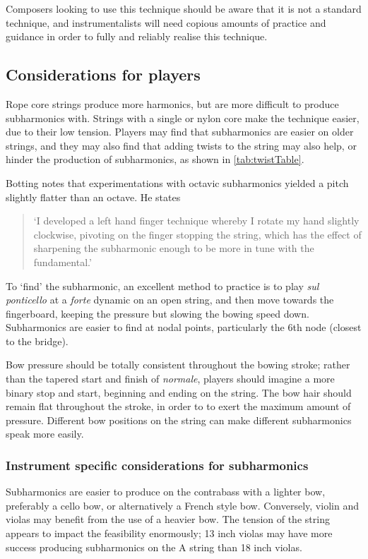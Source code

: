 Composers looking to use this technique should be aware that it is not a standard technique, and instrumentalists will need copious amounts of practice and guidance in order to fully and reliably realise this technique.

\subsection{Considerations for players}
Rope core strings produce more harmonics, but are more difficult to produce subharmonics with.
Strings with a single or nylon core make the technique easier, due to their low tension.\autocite[99]{welbanksFoundationsModernCello}
Players may find that subharmonics are easier on older strings, and they may also find that adding twists to the string may also help, or hinder the production of subharmonics, as shown in \autoref{tab:twistTable}.\autocite[]{kimuraHowProduceSubharmonics1999}


Botting notes that experimentations with octavic subharmonics yielded a pitch slightly flatter than an octave. He states \begin{quotation}
  `I developed a left hand finger technique whereby I rotate my hand slightly clockwise, pivoting on the finger stopping the string, which has the effect of sharpening the subharmonic enough to be more in tune with the fundamental.'\autocite[111]{bottingDevelopingPersonalVocabulary2019}
\end{quotation}

To `find' the subharmonic, an excellent method to practice is to play \emph{sul ponticello} at a \emph{forte} dynamic on an open string, and then move towards the fingerboard, keeping the pressure but slowing the bowing speed down.
Subharmonics are easier to find at nodal points, particularly the 6th node (closest to the bridge).\autocite[]{appleseedFeedbackSightreadingSession2019}

Bow pressure should be totally consistent throughout the bowing stroke; rather than the tapered start and finish of \emph{normale}, players should imagine a more binary stop and start, beginning and ending on the string.
The bow hair should remain flat throughout the stroke, in order to to exert the maximum amount of pressure.\autocite[]{kimuraHowProduceSubharmonics1999}
Different bow positions on the string can make different subharmonics speak more easily.\autocite[]{kimuraHowProduceSubharmonics1999}

\subsubsection{Instrument specific considerations for subharmonics}
Subharmonics are easier to produce on the contrabass with a lighter bow, preferably a cello bow, or alternatively a French style bow.\autocite[]{longSubharmonics2019}
Conversely, violin and violas may benefit from the use of a heavier bow.\autocite[]{appleseedFeedbackSightreadingSession2019}
The tension of the string appears to impact the feasibility enormously; 13 inch violas may have more success producing subharmonics on the A string than 18 inch violas.\autocite[]{appleseedFeedbackSightreadingSession2019}



